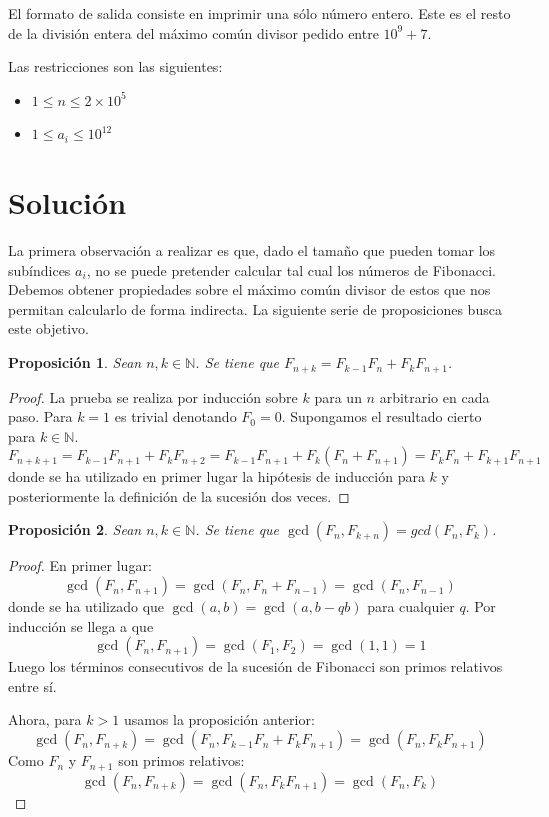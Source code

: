 \documentclass{article}
\theoremstyle{theorem-style}  %
\newtheorem{proposition}{Proposición}
\theoremstyle{definition}
\theoremstyle{example-style}
\begin{document}
    El formato de salida consiste en imprimir una sólo número entero. Este es el resto de la división entera del máximo común divisor pedido entre $10^9+7$.

    Las restricciones son las siguientes:
    \begin{itemize}
        \item $1 \leq n \leq 2 \times 10^5$
        \item $1 \leq a_i \leq 10^{12}$
    \end{itemize}

\section*{Solución}
    
    La primera observación a realizar es que, dado el tamaño que pueden tomar los subíndices $a_i$, no se puede pretender calcular tal cual los números de Fibonacci. Debemos obtener propiedades sobre el máximo común divisor de estos que nos permitan calcularlo de forma indirecta. La siguiente serie de proposiciones busca este objetivo. 
    
    \begin{proposition}
        Sean $n, k \in \mathbb{N}$. Se tiene que $F_{n+k} = F_{k-1}F_n + F_k F_{n+1}$. 
    \end{proposition}
    \begin{proof}
        La prueba se realiza por inducción sobre $k$ para un $n$ arbitrario en cada paso. Para $k=1$ es trivial denotando $F_0 = 0$. Supongamos el resultado cierto para $k \in \mathbb{N}$. 
        $$ F_{n+k+1} = F_{k-1}F_{n+1} + F_k F_{n+2} = F_{k-1}F_{n+1} + F_k (F_{n} + F_{n+1}) = F_{k}F_n + F_{k+1} F_{n+1} $$
        donde se ha utilizado en primer lugar la hipótesis de inducción para $k$ y posteriormente la definición de la sucesión dos veces.
    \end{proof}
    
    \begin{proposition}
        Sean $n, k \in \mathbb{N}$. Se tiene que $\gcd(F_n, F_{k+n}) = gcd(F_n, F_k)$. 
    \end{proposition}
    \begin{proof}
        En primer lugar: 
        $$ \gcd(F_n, F_{n+1}) = \gcd(F_{n}, F_{n}+F_{n-1}) = \gcd(F_{n}, F_{n-1}) $$
        donde se ha utilizado que $\gcd(a,b) = \gcd(a,b-qb)$ para cualquier $q$. Por inducción se llega a que 
        $$ \gcd(F_n, F_{n+1}) = \gcd(F_{1}, F_{2}) = \gcd(1,1) = 1 $$
        Luego los términos consecutivos de la sucesión de Fibonacci son primos relativos entre sí.
                
        Ahora, para $k > 1$ usamos la proposición anterior:
        $$ \gcd(F_n, F_{n+k}) = \gcd(F_n, F_{k-1}F_n + F_k F_{n+1}) = \gcd(F_n, F_k F_{n+1}) $$
        Como $F_n$ y $F_{n+1}$ son primos relativos:
        $$ \gcd(F_n, F_{n+k}) = \gcd(F_n, F_k F_{n+1}) = \gcd(F_n, F_k) $$
    \end{proof}
    
\end{document}
